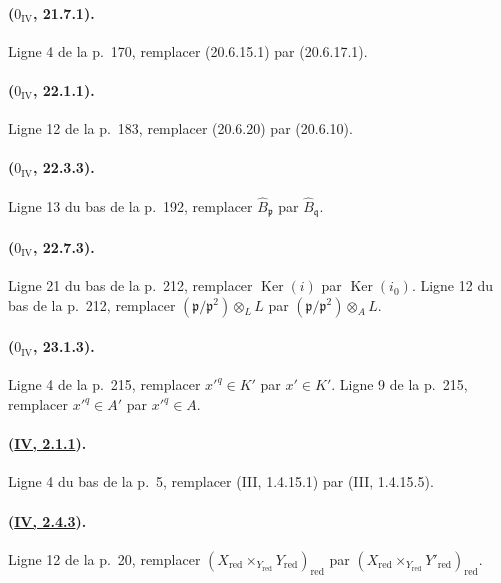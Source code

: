 \paragraph{($0_{\mathrm{IV}}$, 21.7.1).}
Ligne 4 de la p.~170, remplacer (20.6.15.1) par (20.6.17.1).

\paragraph{($0_{\mathrm{IV}}$, 22.1.1).}
Ligne 12 de la p.~183, remplacer (20.6.20) par (20.6.10).

\paragraph{($0_{\mathrm{IV}}$, 22.3.3).}
Ligne 13 du bas de la p.~192, remplacer $\widehat B_{\mathfrak p}$ par
$\widehat B_{\mathfrak q}$.

\paragraph{($0_{\mathrm{IV}}$, 22.7.3).}
Ligne 21 du bas de la p.~212, remplacer $\operatorname{Ker}(i)$ par
$\operatorname{Ker}(i_0)$. Ligne 12 du bas de la p.~212, remplacer
$(\mathfrak p/\mathfrak p^2)\otimes_L L$ par
$(\mathfrak p/\mathfrak p^2)\otimes_A L$.

\paragraph{($0_{\mathrm{IV}}$, 23.1.3).}
Ligne 4 de la p.~215, remplacer $x'^q\in K'$ par $x'\in K'$. Ligne 9
de la p.~215, remplacer $x'^q\in A'$ par $x'^q\in A$.

\paragraph{({\texorpdfstring{\protect\hyperref[canon-index.ega4.c04.statement.2-1-1]{IV, 2.1.1}}{IV, 2.1.1}}).}
Ligne 4 du bas de la p.~5, remplacer (III, 1.4.15.1) par
(III, 1.4.15.5).

\paragraph{({\texorpdfstring{\protect\hyperref[canon-index.ega4.c04.prop.2-4-3]{IV, 2.4.3}}{IV, 2.4.3}}).}
Ligne 12 de la p.~20, remplacer
$(X_{\mathrm{red}}\times_{Y_{\mathrm{red}}}Y_{\mathrm{red}})_{\mathrm{red}}$
par
$(X_{\mathrm{red}}\times_{Y_{\mathrm{red}}}Y'_{\mathrm{red}})_{\mathrm{red}}$.

